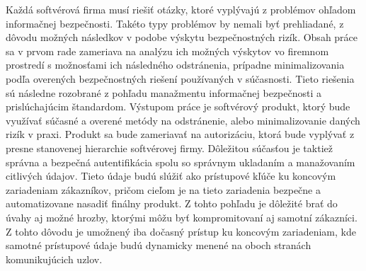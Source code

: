 \newpage
\thispagestyle{plain}

Každá softvérová firma musí riešiť otázky, ktoré vyplývajú z problémov ohľadom informačnej bezpečnosti.
Takéto typy problémov by nemali byť prehliadané, z dôvodu možných následkov v podobe výskytu bezpečnostných rizík.
Obsah práce sa v prvom rade zameriava na analýzu ich možných výskytov vo firemnom prostredí s možnosťami ich následného
odstránenia, prípadne minimalizovania podľa overených bezpečnostných riešení používaných v súčasnosti.
Tieto riešenia sú následne rozobrané z pohľadu manažmentu informačnej bezpečnosti a prislúchajúcim štandardom.
Výstupom práce je softvérový produkt, ktorý bude využívať súčasné a overené metódy na odstránenie, alebo minimalizovanie
daných rizík v praxi.
Produkt sa bude zameriavať na autorizáciu, ktorá bude vyplývať z presne stanovenej hierarchie softvérovej firmy.
Dôležitou súčasťou je taktiež správna a bezpečná autentifikácia spolu so správnym ukladaním a manažovaním citlivých údajov.
Tieto údaje budú slúžiť ako prístupové kľúče ku koncovým zariadeniam zákazníkov, pričom cieľom je na tieto zariadenia
bezpečne a automatizovane nasadiť finálny produkt.
Z tohto pohľadu je dôležité brať do úvahy aj možné hrozby, ktorými môžu byť kompromitovaní aj samotní zákazníci.
Z tohto dôvodu je umožnený iba dočasný prístup ku koncovým zariadeniam, kde samotné prístupové údaje budú dynamicky
menené na oboch stranách komunikujúcich uzlov.
\emptypage


